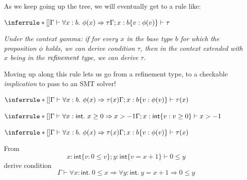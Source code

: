 \documentclass{beamer}
\begin{document}
\begin{frame} 
As we keep going up the tree, we will eventually get to a rule like: 
\begin{block}{}
\begin{center}
$
\inferrule*[]{
	\Gamma \vdash \forall x : b .\ \phi(x) \Rightarrow \tau
 }{ 
 \Gamma; x: b \{ v : \phi(v) \} \vdash \tau
}
$
\end{center} 
\end{block}

\textit{Under the context gamma: if for every $x$ in the base type $b$ for which the proposition $\phi$ holds, we can derive condition $\tau$, then in the context extended with $x$ being in the $\emph{refinement}$ type, we can derive $\tau$.}

Moving up along this rule lets us go from a refinement type, to a checkable \emph{implication} to pass to an SMT solver!
\end{frame} 

\begin{frame} 
\begin{block}{}
\begin{center}
$
\inferrule*[]{
	\Gamma \vdash \forall x : b .\ \phi(x) \Rightarrow \tau(x)
 }{ 
 \Gamma; x: b \{ v : \phi(v) \} \vdash \tau(x)
}
$
\end{center} 
\end{block}

\begin{block}{}
\begin{center}
$
\inferrule*[]{
	\Gamma \vdash \forall x : \mathsf{int} .\ x \geq 0 \Rightarrow x > -1
 }{ 
 \Gamma; x: \mathsf{int} \{ v : v \geq 0 \} \vdash  x > -1
}
$
\end{center} 
\end{block}

\end{frame} 





\begin{frame} 
\begin{block}{}
\begin{center}
$
\inferrule*[]{
	\Gamma \vdash \forall x : b .\ \phi(x) \Rightarrow \tau(x)
 }{ 
 \Gamma; x: b \{ v : \phi(v) \} \vdash \tau(x)
}
$
\end{center} 
\end{block}

\begin{block}{}
From 
\[
 x: \mathsf{int} \{ v : 0 \leq v \}; y: \mathsf{int}\{ v = x + 1\} \vdash  0 \leq y
\]
derive condition
\[
	\Gamma \vdash \forall x : \mathsf{int} .\ 0 \leq x \Rightarrow \forall y :\mathsf{int}
	.\ y = x+ 1 \Rightarrow 0 \leq y
\]
\end{block}

\end{frame} 
\end{document}
